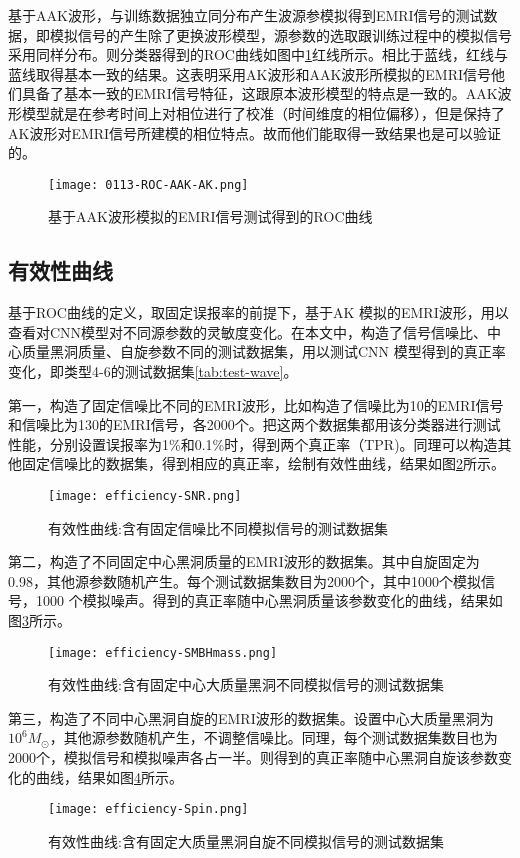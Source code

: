 基于AAK波形，与训练数据独立同分布产生波源参模拟得到EMRI信号的测试数据，即模拟信号的产生除了更换波形模型，源参数的选取跟训练过程中的模拟信号采用同样分布。则分类器得到的ROC曲线如图中\ref{fig:ROC-AAK-iid}红线所示。相比于蓝线，红线与蓝线取得基本一致的结果。这表明采用AK波形和AAK波形所模拟的EMRI信号他们具备了基本一致的EMRI信号特征，这跟原本波形模型的特点是一致的。AAK波形模型就是在参考时间上对相位进行了校准（时间维度的相位偏移），但是保持了AK波形对EMRI信号所建模的相位特点。故而他们能取得一致结果也是可以验证的。
\begin{figure}[!htbp]
 \centering
 \texttt{[image: 0113-ROC-AAK-AK.png]}
\caption{\label{fig:ROC-AAK-iid}基于AAK波形模拟的EMRI信号测试得到的ROC曲线}
\end{figure}

\subsection{有效性曲线}
基于ROC曲线的定义，取固定误报率的前提下，基于AK 模拟的EMRI波形，用以查看对CNN模型对不同源参数的灵敏度变化。在本文中，构造了信号信噪比、中心质量黑洞质量、自旋参数不同的测试数据集，用以测试CNN 模型得到的真正率变化，即类型4-6的测试数据集\ref{tab:test-wave}。

第一，构造了固定信噪比不同的EMRI波形，比如构造了信噪比为10的EMRI信号和信噪比为130的EMRI信号，各2000个。把这两个数据集都用该分类器进行测试性能，分别设置误报率为1\%和0.1\%时，得到两个真正率（TPR)。同理可以构造其他固定信噪比的数据集，得到相应的真正率，绘制有效性曲线，结果如图\ref{fig:EC-SNR}所示。
\begin{figure}[!htbp]
\centering
\texttt{[image: efficiency-SNR.png]}
\caption{\label{fig:EC-SNR}有效性曲线:含有固定信噪比不同模拟信号的测试数据集}
\end{figure}

第二，构造了不同固定中心黑洞质量的EMRI波形的数据集。其中自旋固定为0.98，其他源参数随机产生。每个测试数据集数目为2000个，其中1000个模拟信号，1000 个模拟噪声。得到的真正率随中心黑洞质量该参数变化的曲线，结果如图\ref{fig:EC-SMBHmass}所示。
\begin{figure}[!htbp]
 \centering
 \texttt{[image: efficiency-SMBHmass.png]}
    \caption{\label{fig:EC-SMBHmass}有效性曲线:含有固定中心大质量黑洞不同模拟信号的测试数据集}
\end{figure}

第三，构造了不同中心黑洞自旋的EMRI波形的数据集。设置中心大质量黑洞为$10^6 M_{\odot}$，其他源参数随机产生，不调整信噪比。同理，每个测试数据集数目也为2000个，模拟信号和模拟噪声各占一半。则得到的真正率随中心黑洞自旋该参数变化的曲线，结果如图\ref{fig:EC-Spin}所示。
\begin{figure}[!htbp]
 \centering
 \texttt{[image: efficiency-Spin.png]}
    \caption{\label{fig:EC-Spin}有效性曲线:含有固定大质量黑洞自旋不同模拟信号的测试数据集}
\end{figure}

